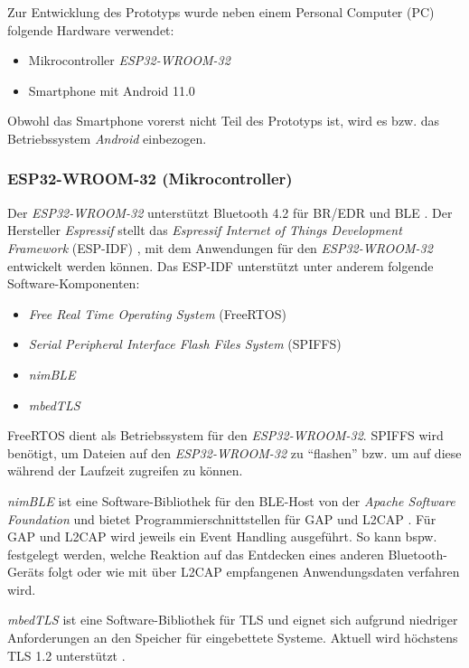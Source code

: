 Zur Entwicklung des Prototyps wurde neben einem Personal Computer (PC) folgende Hardware verwendet:

\begin{itemize}
    \item Mikrocontroller \textit{ESP32-WROOM-32}
    \item Smartphone mit Android 11.0
\end{itemize}

Obwohl das Smartphone vorerst nicht Teil des Prototyps ist, wird es bzw. das Betriebssystem \textit{Android} einbezogen.

\subsubsection{ESP32-WROOM-32 (Mikrocontroller)}
Der \textit{ESP32-WROOM-32} unterstützt Bluetooth 4.2 für BR/EDR und BLE \cite{ESP32_6}. Der Hersteller \textit{Espressif} stellt das \textit{Espressif Internet of Things Development Framework} (ESP-IDF) \cite{ESPIDF}, mit dem Anwendungen für den \textit{ESP32-WROOM-32} entwickelt werden können. Das ESP-IDF unterstützt unter anderem folgende Software-Komponenten:

\begin{itemize}
    \item \textit{Free Real Time Operating System} (FreeRTOS)
    \item \textit{Serial Peripheral Interface Flash Files System} (SPIFFS)
    \item \textit{nimBLE}
    \item \textit{mbedTLS}
\end{itemize}

FreeRTOS dient als Betriebssystem für den \textit{ESP32-WROOM-32}. SPIFFS wird benötigt, um Dateien auf den \textit{ESP32-WROOM-32} zu "`flashen"' bzw. um auf diese während der Laufzeit zugreifen zu können.

\textit{nimBLE} ist eine Software-Bibliothek für den BLE-Host von der \textit{Apache Software Foundation} und bietet Programmierschnittstellen für GAP und L2CAP \cite{nimBLE}. Für GAP und L2CAP wird jeweils ein Event Handling ausgeführt. So kann bspw. festgelegt werden, welche Reaktion auf das Entdecken eines anderen Bluetooth-Geräts folgt oder wie mit über L2CAP empfangenen Anwendungsdaten verfahren wird.

\textit{mbedTLS} ist eine Software-Bibliothek für TLS und eignet sich aufgrund niedriger Anforderungen an den Speicher für eingebettete Systeme. Aktuell wird höchstens TLS 1.2 unterstützt \cite{ArmMbedCoreFeatures}.

